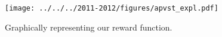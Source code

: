 \begin{figure}[h!]
\centering
\texttt{[image: ../../../2011-2012/figures/apvst\_expl.pdf]}
\caption{
Graphically representing our reward function.
}\label{fig:det_rewards}
\end{figure}
